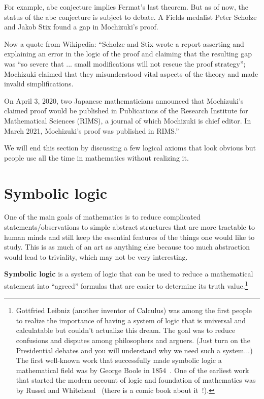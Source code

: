 \begin{example}
    For example, abc conjecture implies Fermat's last theorem. But as of now, the status of the abc conjecture is subject to debate. A Fields medalist Peter Scholze and Jakob Stix found a gap in Mochizuki's proof.
    
    Now a quote from Wikipedia: ``Scholze and Stix wrote a report asserting and explaining an error in the logic of the proof and claiming that the resulting gap was ``so severe that ... small modifications will not rescue the proof strategy''; Mochizuki claimed that they misunderstood vital aspects of the theory and made invalid simplifications.

    On April 3, 2020, two Japanese mathematicians announced that Mochizuki's claimed proof would be published in Publications of the Research Institute for Mathematical Sciences (RIMS), a journal of which Mochizuki is chief editor. In March 2021, Mochizuki's proof was published in RIMS.''
\end{example}

We will end this section by discussing a few logical axioms that look obvious
but people use all the time in mathematics without realizing it.

   

\section{Symbolic logic}
One of the main goals of mathematics is to reduce complicated statements/observations
to simple abstract structures that are more tractable to human minds and still
keep the essential features of the things one would like to study.
This is as much of an art as anything else because too much abstraction would
lead to triviality, which may not be very interesting.

{\bf Symbolic logic} is a system of logic that can be used to reduce a mathematical 
statement into ``agreed'' formulas that are easier to determine its truth 
value.\footnote{
    Gottfried Leibniz (another inventor of Calculus) was among 
    the first people to realize the importance of having a system
of logic that is universal and calculatable but couldn't actualize this dream.
The goal was to reduce confusions and disputes among philosophers and arguers.
(Just turn on the Presidential debates and you will understand why we need
such a system...)
The first well-known work that successfully made symbolic logic a mathematical field
was by George Boole in 1854~\cite{Boole2009}.
One of the earliest work that started the 
modern account of logic and foundation of mathematics was by Russel and 
Whitehead~\cite{WhiteheadRussell1997} 
(there is a comic book about it~\cite{DoxiadisPapadimitriou2009}!).
}

